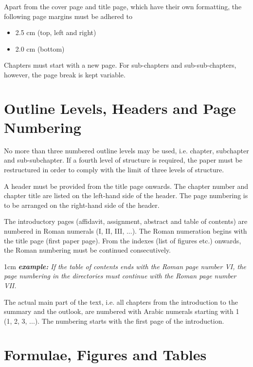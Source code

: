 Apart from the cover page and title page, which have their own formatting, the following page margins must be adhered to

\begin{itemize}
	\item 2.5 cm (top, left and right)
	\item 2.0 cm (bottom)
\end{itemize}

Chapters must start with a new page. For sub-chapters and sub-sub-chapters, however, the page break is kept variable.


\section{Outline Levels, Headers and Page Numbering}
\label{sec:numbering}

No more than three numbered outline levels may be used, i.e. chapter, subchapter and sub-subchapter. If a fourth level of structure is required, the paper must be restructured in order to comply with the limit of three levels of structure.

A header must be provided from the title page onwards. The chapter number and chapter title are listed on the left-hand side of the header. The page numbering is to be arranged on the right-hand side of the header. 

The introductory pages (affidavit, assignment, abstract and table of contents) are numbered in Roman numerals (I, II, III, ...). The Roman numeration begins with the title page (first paper page). From the indexes (list of figures etc.) onwards, the Roman numbering must be continued consecutively. 

\begin{addmargin}[1cm]{1cm}
	\textit{\textbf{example:} If the table of contents ends with the Roman page number \textit{VI}, the page numbering in the directories must continue with the Roman page number \textit{VII}.}
\end{addmargin}
	
	The actual main part of the text, i.e. all chapters from the introduction to the summary and the outlook, are numbered with Arabic numerals starting with 1 (1, 2, 3, ...). The numbering starts with the first page of the introduction.



\section{Formulae, Figures and Tables}

